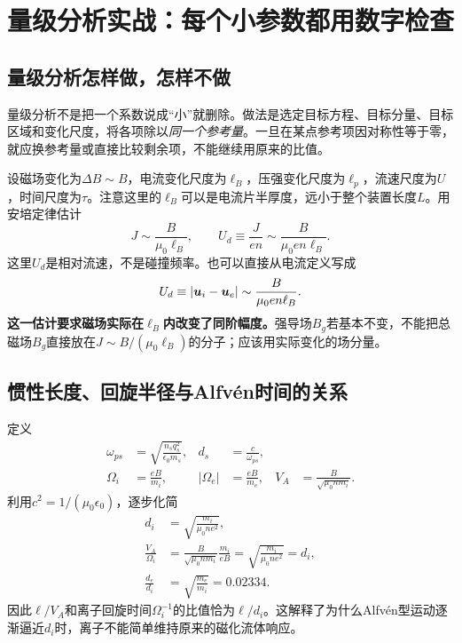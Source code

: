 \chapter{量级分析实战：每个小参数都用数字检查}
\label{hall:ordering}
\section{量级分析怎样做，怎样不做}
量级分析不是把一个系数说成“小”就删除。做法是选定目标方程、目标分量、目标区域和变化尺度，将各项除以\emph{同一个参考量}。一旦在某点参考项因对称性等于零，就应换参考量或直接比较剩余项，不能继续用原来的比值。

设磁场变化为$\Delta B\sim B$，电流变化尺度为$\ell_B$，压强变化尺度为$\ell_p$，流速尺度为$U$，时间尺度为$\tau$。注意这里的$\ell_B$可以是电流片半厚度，远小于整个装置长度$L$。用安培定律估计
\begin{equation}
J\sim\frac{B}{\mu_0\ell_B},\qquad
U_d\equiv\frac{J}{en}\sim\frac{B}{\mu_0en\ell_B}.
\end{equation}
这里$U_d$是相对流速，不是碰撞频率。也可以直接从电流定义写成
\begin{equation}
U_d\equiv |\bm{u}_i-\bm{u}_e|\sim\frac{B}{\mu_0en\ell_B}.
\end{equation}
\textbf{这一估计要求磁场实际在$\ell_B$内改变了同阶幅度。}强导场$B_g$若基本不变，不能把总磁场$B_g$直接放在$J\sim B/(\mu_0\ell_B)$的分子；应该用实际变化的场分量。

\section{惯性长度、回旋半径与Alfvén时间的关系}
定义
\begin{align}
\omega_{ps}&=\sqrt{\frac{n_sq_s^2}{\epsilon_0m_s}},&d_s&=\frac{c}{\omega_{ps}},\\
\Omega_i&=\frac{eB}{m_i},&|\Omega_e|&=\frac{eB}{m_e},&
V_A&=\frac{B}{\sqrt{\mu_0nm_i}}.
\end{align}
利用$c^2=1/(\mu_0\epsilon_0)$，逐步化简
\begin{align}
d_i&=\sqrt{\frac{m_i}{\mu_0ne^2}},\\
\frac{V_A}{\Omega_i}
&=\frac{B}{\sqrt{\mu_0nm_i}}\frac{m_i}{eB}
=\sqrt{\frac{m_i}{\mu_0ne^2}}=d_i,\\
\frac{d_e}{d_i}&=\sqrt{\frac{m_e}{m_i}}=0.02334.
\end{align}
因此$\ell/V_A$和离子回旋时间$\Omega_i^{-1}$的比值恰为$\ell/d_i$。这解释了为什么Alfvén型运动逐渐逼近$d_i$时，离子不能简单维持原来的磁化流体响应。

